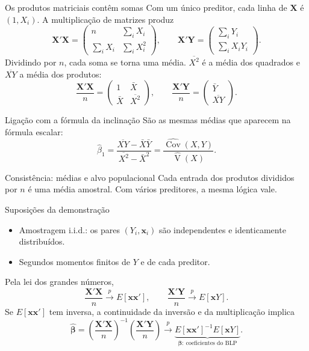 \documentclass[
  ignorenonframetext,
  brazilian,
  aspectratio=169,
  10pt]{beamer}
\begin{document}
\begin{frame}{Os produtos matriciais contêm somas}
\protect{}\label{os-produtos-matriciais-contuxeam-somas}
Com um único preditor, cada linha de \(\mathbf X\) é \((1,X_i)\). A
multiplicação de matrizes produz \[
\mathbf X'\mathbf X=
\begin{pmatrix}
n & \sum_i X_i\\
\sum_i X_i & \sum_i X_i^2
\end{pmatrix},
\qquad
\mathbf X'\mathbf Y=
\begin{pmatrix}\sum_i Y_i\\\sum_i X_iY_i\end{pmatrix}.
\] Dividindo por \(n\), cada soma se torna uma média. \(\overline{X^2}\)
é a média dos quadrados e \(\overline{XY}\) a média dos produtos: \[
\frac{\mathbf X'\mathbf X}{n}=
\begin{pmatrix}1 & \bar X\\\bar X & \overline{X^2}\end{pmatrix},
\qquad
\frac{\mathbf X'\mathbf Y}{n}=
\begin{pmatrix}\bar Y\\\overline{XY}\end{pmatrix}.
\]

\begin{block}{Ligação com a fórmula da inclinação}
São as mesmas médias que aparecem na fórmula escalar:
\[
\widehat\beta_1=
\frac{\overline{XY}-\bar X\bar Y}{\overline{X^2}-\bar X^2}
=\frac{\widehat{\operatorname{Cov}}(X,Y)}{\widehat{\operatorname{V}}(X)}.
\]
\end{block}
\end{frame}

\begin{frame}{Consistência: médias e alvo populacional}
\protect{}\label{consistuxeancia-muxe9dias-e-alvo-populacional}
Cada entrada dos produtos divididos por \(n\) é uma média amostral. Com
vários preditores, a mesma lógica vale.

\begin{block}{Suposições da demonstração}
\begin{itemize}
\item Amostragem i.i.d.: os pares $(Y_i,\mathbf x_i)$ são independentes e identicamente distribuídos.
\item Segundos momentos finitos de $Y$ e de cada preditor.
\end{itemize}
\end{block}

Pela lei dos grandes números, \[
\frac{\mathbf X'\mathbf X}{n}\xrightarrow{p}E[\mathbf x\mathbf x'],
\qquad
\frac{\mathbf X'\mathbf Y}{n}\xrightarrow{p}E[\mathbf xY].
\] Se \(E[\mathbf x\mathbf x']\) tem inversa, a continuidade da inversão
e da multiplicação implica \[
\widehat{\boldsymbol\beta}
=\left(\frac{\mathbf X'\mathbf X}{n}\right)^{-1}
\left(\frac{\mathbf X'\mathbf Y}{n}\right)
\xrightarrow{p}
\underbrace{E[\mathbf x\mathbf x']^{-1}E[\mathbf xY]}_{\boldsymbol\beta:\ \text{coeficientes do BLP}}.
\]
\end{frame}
\end{document}
